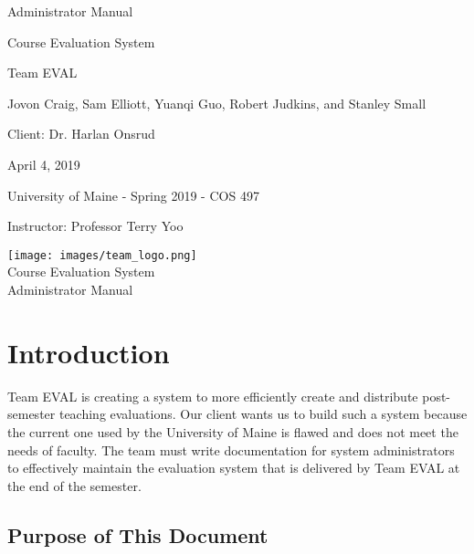 \documentclass{article}
\begin{document}
\begin{titlepage}

\centering
\vspace*{2cm}
{\Huge Administrator Manual\par}
\vspace{.25cm}
{\LARGE Course Evaluation System\par}
\vspace{1cm}
{\Large Team EVAL\par}
\vspace{.2cm}
{\Large Jovon Craig, Sam Elliott, Yuanqi Guo, Robert Judkins, and Stanley Small\par}
\vspace{1cm}
{\Large Client: Dr. Harlan Onsrud\par}
\vspace{1cm}
{\Large April 4, 2019\par}
\vspace{11cm}

University of Maine - Spring 2019 - COS 497

Instructor: Professor Terry Yoo

\end{titlepage}

\newpage

\begin{center}
{\texttt{[image: images/team\_logo.png]}} \\ 	\bigskip
{\LARGE Course Evaluation System } \\ \medskip
{\large Administrator Manual } \\ \medskip
\end{center}

\tableofcontents

\newpage

\section{Introduction}

Team EVAL is creating a system to more efficiently create and distribute post-semester teaching evaluations. Our client wants us to build such a system because the current one used by the University of Maine is flawed and does not meet the needs of faculty. The team must write documentation for system administrators to effectively maintain the evaluation system that is delivered by Team EVAL at the end of the semester.
 
\subsection{Purpose of This Document}
\end{document}
